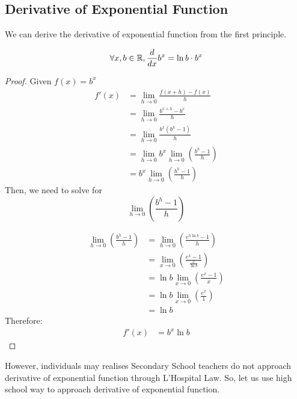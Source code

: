 \subsection{Derivative of Exponential Function}
We can derive the derivative of exponential function from the first principle. 
\begin{proposition}
    $$\forall x, b \in \mathbb{R}, \frac{d}{dx} b^x = \ln b \cdot b^x$$
    \begin{proof}
        Given $f(x) = b^x$
        \begin{align*}
            f'(x) &= \lim_{h \to 0}\frac{f(x + h) - f(x)}{h} \\
            &= \lim_{h \to 0} \frac{b^{x + h} - b^{x}}{h} \\
            &= \lim_{h \to 0} \frac{b^x (b^h - 1)}{h} \\
            &= \lim_{h \to 0} b^x \lim_{h \to 0}\left (\frac{b^h - 1}{h} \right ) \\
            &= b^x \lim_{h \to 0}\left (\frac{b^h - 1}{h} \right )
        \end{align*}
        Then, we need to solve for $$\lim_{h \to 0} \left(\frac{b^h - 1}{h}\right)$$

        \begin{align*}
            \lim_{h \to 0} \left(\frac{b^h - 1}{h}\right) &=   \lim_{h \to 0} \left(\frac{e^{h\ln b} - 1}{h}\right) \\
            &=   \lim_{x \to 0} \left(\frac{e^x - 1}{\frac{x}{\ln b}}\right) \\
            &= \ln b   \lim_{x \to 0} \left(\frac{e^x - 1}{x}\right) \\
            &= \ln b \lim_{x \to 0} \left(\frac{e^x}{1}\right) \\ 
            &= \ln b
        \end{align*}
        Therefore:
        \begin{align*}
            f'(x) &= b^x \ln b
        \end{align*}
    \end{proof}
\end{proposition}

However, individuals may realises Secondary School teachers do not approach derivative of exponential function through L'Hospital Law. 
So, let us use high school way to approach derivative of exponential function. 

